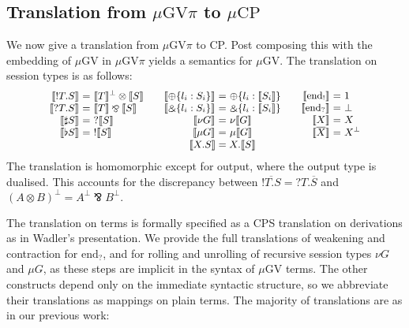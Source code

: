 \documentclass[orivec,envcountsame]{llncs}
\makeatletter
\newcommand{\with}{\mathbin\binampersand}
\newcommand{\parr}{\mathbin\bindnasrepma}
\newcommand{\cpdual}[1]{#1^\perp}
\newcommand{\cpbang}[1]{{! #1}}
\newcommand{\cpquery}[1]{{? #1}}
\newcommand{\gvdual}[1]{\overline{#1}}
\newcommand{\gvout}[2]{{!#1.#2}}
\newcommand{\gvin}[2]{{?#1.#2}}
\newcommand{\outterm}{\mathrm{end}_!}
\newcommand{\interm}{\mathrm{end}_?}
\newcommand{\gvserver}[1]{\flat #1}
\newcommand{\gvservice}[1]{\sharp #1}
\newcommand{\tocp}[1]{\llbracket #1 \rrbracket}
\newcommand{\mucp}{$\mu\mathrm{CP}$\xspace}
\newcommand{\mugv}{$\mu\mathrm{GV}$\xspace}
\newcommand{\gvpi}{$\mu\mathrm{GV}\pi$\xspace}
\newcommand{\ba}{\begin{array}}
\newcommand{\ea}{\end{array}}
\newenvironment{eqs}{\ba{@{}r@{~}c@{~}l@{}}}{\ea}
\makeatother
\begin{document}
\subsection{Translation from \gvpi to \mucp}\label{sec:gvpitocp}

We now give a translation from \gvpi to CP. Post composing this with the embedding of \mugv in \gvpi
yields a semantics for \mugv. The translation on session types is as follows:
\[\small
\ba{@{}c@{\qquad}c@{\qquad}c@{}}
\begin{eqs}
\tocp{\gvout{T}{S}}        &=& \cpdual{\tocp{T}} \otimes \tocp{S} \\
\tocp{\gvin{T}{S}}         &=& \tocp{T} \parr \tocp{S} \\
\tocp{\gvservice{S}}       &=& \cpquery{\tocp{S}} \\
\tocp{\gvserver{S}}        &=& \cpbang{\tocp{S}} \\
\end{eqs}
&
\begin{eqs}
\tocp{\oplus \{l_i:S_i \}} &=& \oplus \{l_i:\tocp{S_i}\} \\
\tocp{\with \{l_i:S_i \}}  &=& \with \{l_i:\tocp{S_i}\} \\
\tocp{\nu G}               &=& \nu\tocp{G} \\
\tocp{\mu G}               &=& \mu\tocp{G} \\
\end{eqs}
&
\begin{eqs}
\tocp{\outterm}            &=& 1 \\
\tocp{\interm}             &=& \bot \\
\tocp{X}                   &=& X \\
\tocp{\gvdual{X}}          &=& \cpdual{X} \\
\end{eqs}\\
& \tocp{X.S} = X.\tocp{S} & \\
\ea
\]
The translation is homomorphic except for output, where the output type is dualised. This accounts
for the discrepancy between $\gvdual{\gvout{T}{S}} = \gvin{T}{\gvdual{S}}$ and $\cpdual{(A \otimes
  B)} = \cpdual{A} \parr \cpdual{B}.$

The translation on terms is formally specified as a CPS translation on derivations as in Wadler's
presentation. We provide the full translations of weakening and contraction for $\interm$, and for
rolling and unrolling of recursive session types $\nu G$ and $\mu G$, as these steps are implicit in
the syntax of \mugv terms. The other constructs depend only on the immediate syntactic structure, so
we abbreviate their translations as mappings on plain terms. The majority of translations are as in
our previous work:
\end{document}
